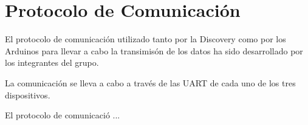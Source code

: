\section{Protocolo de Comunicaci\'on}\label{sec:comunicacion}

El protocolo de comunicaci\'on utilizado tanto por la Discovery como
por los Arduinos para llevar a cabo la transimis\'on de los datos ha
sido desarrollado por los integrantes del grupo.

La comunicaci\'on se lleva a cabo a trav\'es de las UART de cada uno
de los tres dispositivos.

El protocolo de comunicaci\'o ...
